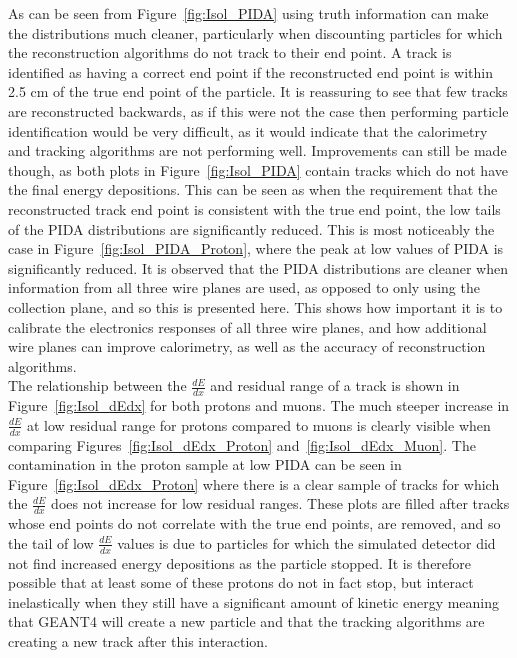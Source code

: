 As can be seen from Figure~\ref{fig:Isol_PIDA} using truth information can make the distributions much cleaner, particularly when discounting particles for which the reconstruction algorithms do not track to their end point. A track is identified as having a correct end point if the reconstructed end point is within 2.5 cm of the true end point of the particle. It is reassuring to see that few tracks are reconstructed backwards, as if this were not the case then performing particle identification would be very difficult, as it would indicate that the calorimetry and tracking algorithms are not performing well. Improvements can still be made though, as both plots in Figure~\ref{fig:Isol_PIDA} contain tracks which do not have the final energy depositions. This can be seen as when the requirement that the reconstructed track end point is consistent with the true end point, the low tails of the PIDA distributions are significantly reduced. This is most noticeably the case in Figure~\ref{fig:Isol_PIDA_Proton}, where the peak at low values of PIDA is significantly reduced. It is observed that the PIDA distributions are cleaner when information from all three wire planes are used, as opposed to only using the collection plane, and so this is presented here. This shows how important it is to calibrate the electronics responses of all three wire planes, and how additional wire planes can improve calorimetry, as well as the accuracy of reconstruction algorithms. \\

The relationship between the $\frac{dE}{dx}$ and residual range of a track is shown in Figure~\ref{fig:Isol_dEdx} for both protons and muons. The much steeper increase in $\frac{dE}{dx}$ at low residual range for protons compared to muons is clearly visible when comparing Figures~\ref{fig:Isol_dEdx_Proton} and~\ref{fig:Isol_dEdx_Muon}. The contamination in the proton sample at low PIDA can be seen in Figure~\ref{fig:Isol_dEdx_Proton} where there is a clear sample of tracks for which the $\frac{dE}{dx}$ does not increase for low residual ranges. These plots are filled after tracks whose end points do not correlate with the true end points, are removed, and so the tail of low $\frac{dE}{dx}$ values is due to particles for which the simulated detector did not find increased energy depositions as the particle stopped. It is therefore possible that at least some of these protons do not in fact stop, but interact inelastically when they still have a significant amount of kinetic energy meaning that GEANT4 will create a new particle and that the tracking algorithms are creating a new track after this interaction. \\


